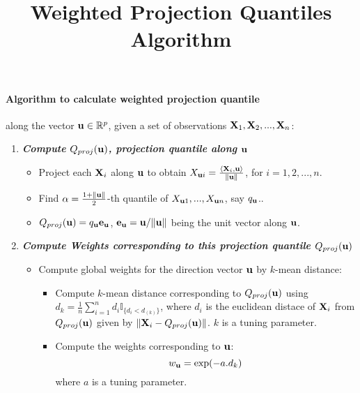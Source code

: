 \documentclass{article}
\title{Weighted Projection Quantiles Algorithm}
\begin{document}
\maketitle

\paragraph{Algorithm to calculate weighted projection quantile} along the vector ${\bf{u}} \in\mathbb{R}^p$, given a set of observations ${\mathbf{X}}_1,{\mathbf{X}}_2,...,{\mathbf{X}}_n$:

\begin{enumerate}

\item \textbf{\textit{Compute $Q_{proj}({\bf{u}})$, projection quantile along ${\bf{u}}$}}

\begin{itemize}
\item Project each ${\mathbf{X}}_i$ along ${\bf{u}}$ to obtain $X_{{\bf{u}} i}=\frac{\langle{\mathbf{X}}_i,{\bf{u}}\rangle}{\|{\bf{u}}\|}$, for $i=1,2,...,n$.
\item Find $\alpha=\frac{1+\|{\bf{u}}\|}{2}$-th quantile of $X_{{\bf{u}} 1},...,X_{{\bf{u}} n}$, say $q_{\bf{u}}$..
\item $Q_{proj}({\bf{u}})=q_{\bf{u}}{\bf{e}}_{\bf{u}}$, ${\bf{e}}_{\bf{u}}={\bf{u}}/\|{\bf{u}}\|$ being the unit vector along ${\bf{u}}$.

\end{itemize}

\item \textit{\textbf{Compute Weights corresponding to this projection quantile $Q_{proj}({\bf{u}})$}}

\begin{itemize}

\item Compute global weights for the direction vector ${\bf{u}}$ by $k$-mean distance:

\begin{itemize}
\item Compute $k$-mean distance corresponding to $Q_{proj}({\bf{u}})$ using $d_k=\frac{1}{n}\sum_{i=1}^nd_i\mathbb{I}_{\{d_i<d_{(k)}\}}$, where $d_i$ is the euclidean distace of ${\mathbf{X}}_i$ from $Q_{proj}({\bf{u}})$ given by $\|{\mathbf{X}}_i-Q_{proj}({\bf{u}})\|$. $k$ is a tuning parameter.\\

\item Compute the weights corresponding to ${\bf{u}}$:
$$w_{\bf{u}}=\exp(-a.d_k)$$
where $a$ is a tuning parameter. 
\end{itemize}


\end{itemize}
\end{enumerate}
\end{document}

